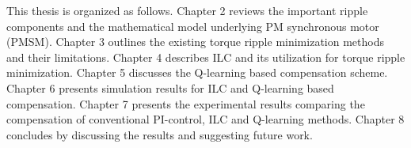 This thesis is organized as follows. Chapter 2 reviews the important ripple components and the mathematical model underlying PM synchronous motor (PMSM). Chapter 3 outlines the existing torque ripple minimization methods and their limitations. Chapter 4 describes ILC and its utilization for torque ripple minimization. Chapter 5 discusses the Q-learning based compensation scheme. Chapter 6 presents simulation results for ILC and Q-learning based compensation. Chapter 7 presents the experimental results comparing the compensation of conventional PI-control, ILC and Q-learning methods. Chapter 8 concludes by discussing the results and suggesting future work.

\clearpage
